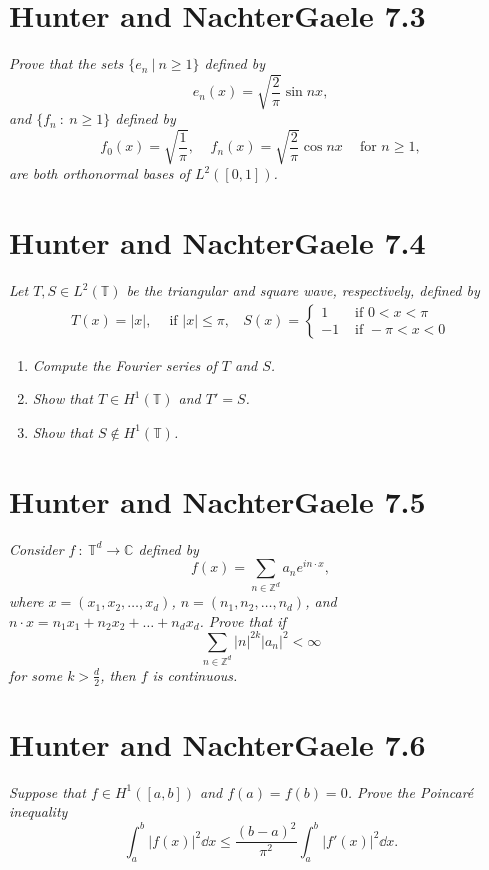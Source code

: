 \documentclass[12pt]{article}
\theoremstyle{plain}
\begin{document}
\section*{Hunter and NachterGaele 7.3}
\emph{Prove that the sets $\{e_n\ |\ n \geq 1\}$ defined by $$e_n(x) = \sqrt{\frac{2}{\pi}}\sin nx,$$ and $\{f_n\ :\ n \geq 1\}$ defined by $$f_0(x) = \sqrt{\frac{1}{\pi}},\ \ \ \ \ f_n(x) = \sqrt{\frac{2}{\pi}}\cos nx\ \ \ \ \text{ for } n \geq 1,$$ are both orthonormal bases of $L^2([0,1])$.}

\section*{Hunter and NachterGaele 7.4}
\emph{Let $T, S \in L^2(\mathbb{T})$ be the triangular and square wave, respectively, defined by}
\begin{align*}
    T(x) = |x|,\ \ \ \ \text{ if } |x| \leq \pi,\ \ \ \ S(x) = \begin{cases}
        1 & \text{ if } 0 < x < \pi \\
        -1 & \text{ if } -\pi < x < 0
    \end{cases}
\end{align*}
\begin{enumerate}[ (a)]
    \item
        \emph{Compute the Fourier series of $T$ and $S$.}
    \item
        \emph{Show that $T \in H^1(\mathbb{T})$ and $T' = S$.}
    \item
        \emph{Show that $S \not\in H^1(\mathbb{T})$.}
\end{enumerate}

\section*{Hunter and NachterGaele 7.5}
\emph{Consider $f\ :\ \mathbb{T}^d \rightarrow \mathbb{C}$ defined by $$f(x) = \sum_{n\in\mathbb{Z}^d}a_n e^{i n \cdot x},$$ where $x = (x_1, x_2, \dots, x_d)$, $n = (n_1, n_2, \dots, n_d)$, and $n\cdot x = n_1x_1 + n_2x_2 + \dots + n_dx_d$.  Prove that if $$\sum_{n\in\mathbb{Z}^d}|n|^{2k}|a_n|^2 <\infty$$ for some $k > \frac{d}{2}$, then $f$ is continuous.}

\section*{Hunter and NachterGaele 7.6}
\emph{Suppose that $f \in H^1([a,b])$ and $f(a) = f(b) = 0$.  Prove the \emph{Poincar\'{e} inequality} $$\int_a^b|f(x)|^2 \dd x \leq \frac{(b-a)^2}{\pi^2}\int_a^b|f'(x)|^2 \dd x.$$}
\end{document}
